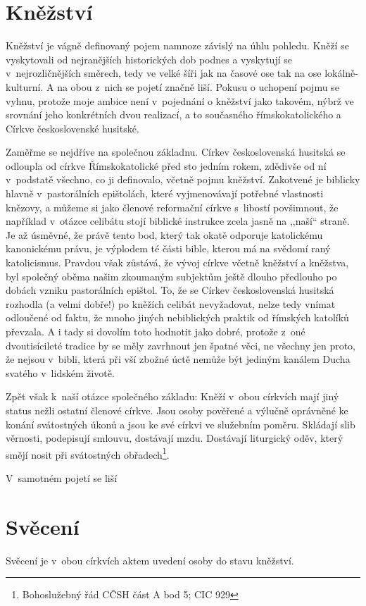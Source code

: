 \chapter{Kněžství}
\label{kap:uvod}

Kněžství je vágně definovaný pojem namnoze závislý na úhlu pohledu. Kněží se
vyskytovali od nejranějších historických dob podnes a vyskytují se
v~nejrozličnějších směrech, tedy ve velké šíři jak na časové ose tak na ose
lokálně-kulturní. A na obou z~nich se pojetí značně liší. Pokusu o uchopení
pojmu se vyhnu, protože moje ambice není v~pojednání o kněžství jako takovém,
nýbrž ve srovnání jeho konkrétních dvou realizací, a to současného
římskokatolického a Církve československé husitské.

Zaměřme se nejdříve na společnou základnu. Církev československá husitská se
odloupla od církve Římskokatolické před sto jedním rokem, zdědivše od ní
v~podstatě všechno, co ji definovalo, včetně pojmu kněžství. Zakotvené je
biblicky hlavně v~pastorálních epištolách, které vyjmenovávají potřebné
vlastnosti knězovy, a můžeme si jako členové reformační církve s~libostí
povšimnout, že například v~otázce celibátu stojí biblické instrukce zcela jasně
na ,,naší`` straně. Je až úsměvné, že právě tento bod, který tak okatě odporuje
katolickému kanonickému právu, je výplodem té části bible, kterou má na svědomí
raný katolicismus. Pravdou však zůstává, že vývoj církve včetně kněžství a
kněžstva, byl společný oběma našim zkoumaným subjektům ještě dlouho předlouho po
dobách vzniku pastorálních epištol. To, že se Církev československá husitská
rozhodla (a velmi dobře!) po kněžích celibát nevyžadovat, nelze tedy vnímat
odloučené od faktu, že mnoho jiných nebiblických praktik od římských katolíků
převzala. A i tady si dovolím toto hodnotit jako dobré, protože z~oné
dvoutisícileté tradice by se měly zavrhnout jen špatné věci, ne všechny jen
proto, že nejsou v~bibli, která při vší zbožné úctě nemůže být jediným kanálem
Ducha svatého v~lidském životě.

Zpět však k~naší otázce společného základu: Kněží v~obou
církvích mají jiný status nežli ostatní členové církve. Jsou osoby pověřené a
výlučně oprávněné ke konání svátostných úkonů a jsou ke své církvi ve služebním
poměru. Skládají slib věrnosti, podepisují smlouvu, dostávají mzdu. Dostávají
liturgický oděv, který smějí nosit při svátostných
obřadech\footnote{Bohoslužebný řád CČSH část A bod 5; CIC 929}.

V~samotném pojetí se liší

\chapter{Svěcení}

Svěcení je v~obou církvích aktem uvedení osoby do stavu kněžství. 
